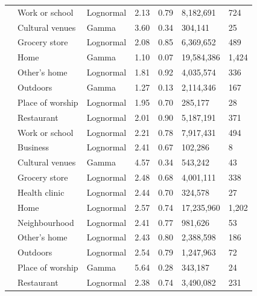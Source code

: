 \documentclass[preprint, 3p,
authoryear]{elsarticle} %
\begin{document}
\begin{table}
{\begin{threeparttable}
\begin{tabular}[t]{rllrrll}
\multirow[t]{-8}{*}{\raggedleft\arraybackslash 2005} & Work or school & Lognormal & 2.13 & 0.79 & 8,182,691 & 724\\
\cmidrule{1-7}
 & Cultural venues & Gamma & 3.60 & 0.34 & 304,141 & 25\\

 & Grocery store & Lognormal & 2.08 & 0.85 & 6,369,652 & 489\\

 & Home & Gamma & 1.10 & 0.07 & 19,584,386 & 1,424\\

 & Other's home & Lognormal & 1.81 & 0.92 & 4,035,574 & 336\\

 & Outdoors & Gamma & 1.27 & 0.13 & 2,114,346 & 167\\

 & Place of worship & Lognormal & 1.95 & 0.70 & 285,177 & 28\\

 & Restaurant & Lognormal & 2.01 & 0.90 & 5,187,191 & 371\\

\multirow[t]{-8}{*}{\raggedleft\arraybackslash 2010} & Work or school & Lognormal & 2.21 & 0.78 & 7,917,431 & 494\\
\cmidrule{1-7}
 & Business & Lognormal & 2.41 & 0.67 & 102,286 & 8\\

 & Cultural venues & Gamma & 4.57 & 0.34 & 543,242 & 43\\

 & Grocery store & Lognormal & 2.48 & 0.68 & 4,001,111 & 338\\

 & Health clinic & Lognormal & 2.44 & 0.70 & 324,578 & 27\\

 & Home & Lognormal & 2.57 & 0.74 & 17,235,960 & 1,202\\

 & Neighbourhood & Lognormal & 2.41 & 0.77 & 981,626 & 53\\

 & Other's home & Lognormal & 2.43 & 0.80 & 2,388,598 & 186\\

 & Outdoors & Lognormal & 2.54 & 0.79 & 1,247,963 & 72\\

 & Place of worship & Gamma & 5.64 & 0.28 & 343,187 & 24\\

 & Restaurant & Lognormal & 2.38 & 0.74 & 3,490,082 & 231\\


\end{tabular}
\end{threeparttable}}
\end{table}
\end{document}
